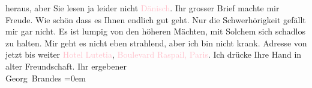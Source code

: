                     heraus, aber Sie lesen ja leider nicht \textcolor{pink}{Dänisch}{}\ledrightnote{\textcolor{pink}{Dänemark}}.\pend
           \pstart
           Ihr grosser Brief machte mir Freude. Wie schön dass es Ihnen endlich gut geht.
                    Nur die Schwerhörigkeit gefällt mir gar nicht. Es ist lumpig von den höheren
                    Mächten, mit Solchem sich schadlos zu halten.\pend
           \pstart
           Mir geht es nicht eben strahlend, aber ich bin nicht krank. Adresse von jetzt bis
                    weiter \textcolor{pink}{Hotel Lutetia}{}\ledrightnote{\textcolor{pink}{Hôtel Lutetia}}, \textcolor{pink}{Boulevard Raspail, Paris}{}\ledrightnote{\textcolor{pink}{Boulevard Raspail}}.\pend
           \pstart
           Ich drücke Ihre Hand in alter Freundschaft.\pend
           \pstart
           Ihr ergebener{\\[\baselineskip]}\spacefill\mbox{Georg Brandes}\pend
           \leftskip=0em{}\endnumbering{}  
      